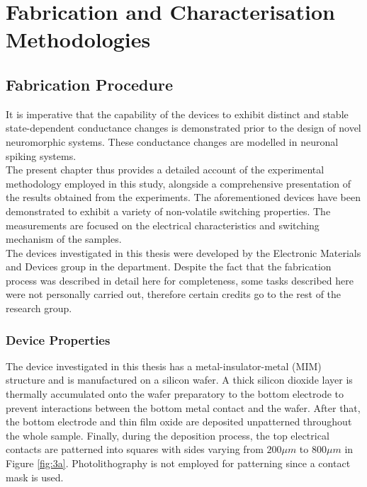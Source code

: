 \chapter{Fabrication and Characterisation Methodologies}


\section[Fabrication Procedure]{Fabrication Procedure}

It is imperative that the capability of the devices to exhibit distinct and stable state-dependent conductance changes is demonstrated prior to the design of novel neuromorphic systems. These conductance changes are modelled in neuronal spiking systems. \\

\noindent The present chapter thus provides a detailed account of the experimental methodology employed in this study, alongside a comprehensive presentation of the results obtained from the experiments. The aforementioned devices have been demonstrated to exhibit a variety of non-volatile switching properties. The measurements are focused on the electrical characteristics and switching mechanism of the samples. \\

\noindent The devices investigated in this thesis were developed by the Electronic Materials and Devices group in the department. Despite the fact that the fabrication process was described in detail here for completeness, some tasks described here were not personally carried out, therefore certain credits go to the rest of the research group.

\subsection[Device Properties]{Device Properties}

\noindent The device investigated in this thesis has a metal-insulator-metal (MIM) structure and is manufactured on a silicon wafer. A thick silicon dioxide layer is thermally accumulated onto the wafer preparatory to the bottom electrode to prevent interactions between the bottom metal contact and the wafer. After that, the bottom electrode and thin film oxide are deposited unpatterned throughout the whole sample. Finally, during the deposition process, the top electrical contacts are patterned into squares with sides varying from $200\mu m$ to $800\mu m$ in Figure \ref{fig:3a}. Photolithography is not employed for patterning since a contact mask is used. \\

